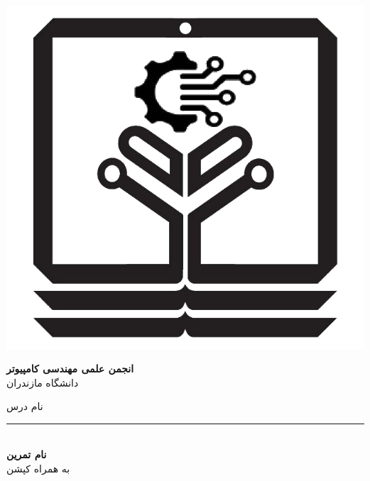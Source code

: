 \begin{titlepage}

\newcommand{\HRule}{\rule{\linewidth}{0.5mm}}


\begin{flushright}
\begin{minipage}{0.15\textwidth}
\includegraphics[scale=.1]{figure/logo.png}
\end{minipage}
\begin{minipage}{0.5\textwidth}
\begin{flushright}
\textbf{\large انجمن علمی مهندسی کامپیوتر}\\
\large دانشگاه مازندران
\end{flushright}
\end{minipage}
\end{flushright}

\begin{center}

\vspace*{8\baselineskip}

{\LARGE 
    نام درس
}

\HRule \\[0.4cm]
\textbf{\Huge
    نام تمرین
}\\
\vspace*{0.5\baselineskip} 
{\large
    به همراه کپشن
}


\end{center}
\end{titlepage}
